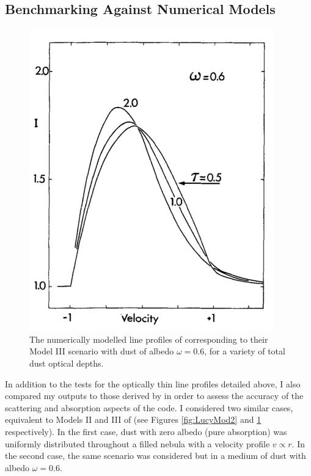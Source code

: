 \subsection{Benchmarking Against Numerical Models}
\label{opt_thick_testing}
\begin{figure}
\centering
\includegraphics[trim =0 0 0 0,clip=true,scale=0.6]{chapters/chapter4/images/Lucy89_Model3.png}
\caption{The numerically modelled line profiles of \citet{Lucy1989} corresponding to their Model III scenario with dust of albedo $\omega=0.6$, for a variety of total dust optical depths.}
\label{fig:LucyMod3}
\end{figure}



In addition to the tests for the optically thin line profiles detailed above, I also compared my outputs to those derived by \citet{Lucy1989} in order to assess the accuracy of the scattering and absorption aspects of the code.  
I  considered two similar cases, equivalent to Models II and III of 
\citet{Lucy1989} (see Figures \ref{fig:LucyMod2} and \ref{fig:LucyMod3} respectively). In the first case, dust with zero albedo (pure absorption) was 
uniformly distributed throughout a filled nebula with a velocity profile 
$v \propto r$.  In the second case, the same scenario was considered but in a 
medium of dust with albedo $\omega =0.6$.

